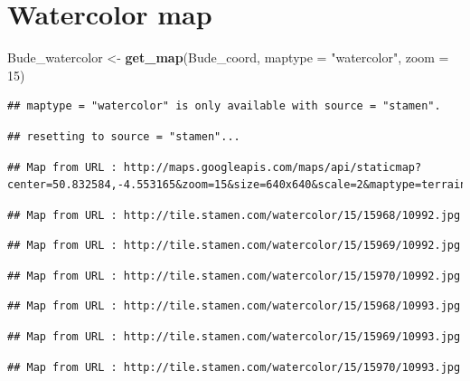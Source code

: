 \documentclass[]{article}
\newenvironment{Shaded}{\begin{snugshade}}{\end{snugshade}}
\newcommand{\DataTypeTok}[1]{\textcolor[rgb]{0.13,0.29,0.53}{#1}}
\newcommand{\DecValTok}[1]{\textcolor[rgb]{0.00,0.00,0.81}{#1}}
\newcommand{\KeywordTok}[1]{\textcolor[rgb]{0.13,0.29,0.53}{\textbf{#1}}}
\newcommand{\NormalTok}[1]{#1}
\newcommand{\StringTok}[1]{\textcolor[rgb]{0.31,0.60,0.02}{#1}}
\begin{document}
\hypertarget{watercolor-map}{%
\section{Watercolor map}\label{watercolor-map}}

\begin{Shaded}
\begin{Highlighting}[]
\NormalTok{Bude_watercolor <-}\StringTok{ }\KeywordTok{get_map}\NormalTok{(Bude_coord, }\DataTypeTok{maptype =} \StringTok{"watercolor"}\NormalTok{, }\DataTypeTok{zoom =} \DecValTok{15}\NormalTok{)}
\end{Highlighting}
\end{Shaded}

\begin{verbatim}
## maptype = "watercolor" is only available with source = "stamen".
\end{verbatim}

\begin{verbatim}
## resetting to source = "stamen"...
\end{verbatim}

\begin{verbatim}
## Map from URL : http://maps.googleapis.com/maps/api/staticmap?center=50.832584,-4.553165&zoom=15&size=640x640&scale=2&maptype=terrain&sensor=false
\end{verbatim}

\begin{verbatim}
## Map from URL : http://tile.stamen.com/watercolor/15/15968/10992.jpg
\end{verbatim}

\begin{verbatim}
## Map from URL : http://tile.stamen.com/watercolor/15/15969/10992.jpg
\end{verbatim}

\begin{verbatim}
## Map from URL : http://tile.stamen.com/watercolor/15/15970/10992.jpg
\end{verbatim}

\begin{verbatim}
## Map from URL : http://tile.stamen.com/watercolor/15/15968/10993.jpg
\end{verbatim}

\begin{verbatim}
## Map from URL : http://tile.stamen.com/watercolor/15/15969/10993.jpg
\end{verbatim}

\begin{verbatim}
## Map from URL : http://tile.stamen.com/watercolor/15/15970/10993.jpg
\end{verbatim}
\end{document}

